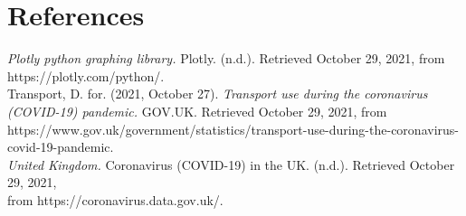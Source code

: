 \documentclass[fontsize=11pt]{article}
\begin{document}
\section*{References}  
\begin{hangparas}{.25in}{1}  
\textit{Plotly python graphing library. } Plotly. (n.d.). Retrieved October 29, 2021, from https://plotly.com/python/. \\  
  
  
Transport, D. for. (2021, October 27). \textit{Transport use during the coronavirus (COVID-19) pandemic.} GOV.UK. Retrieved October 29, 2021, from https://www.gov.uk/government/statistics/transport-use-during-the-coronavirus-covid-19-pandemic. \\  
  
  
\textit{United Kingdom.} Coronavirus (COVID-19) in the UK. (n.d.). Retrieved October 29, 2021, \\ from https://coronavirus.data.gov.uk/.  
  
  
\end{hangparas}  
\end{document}
